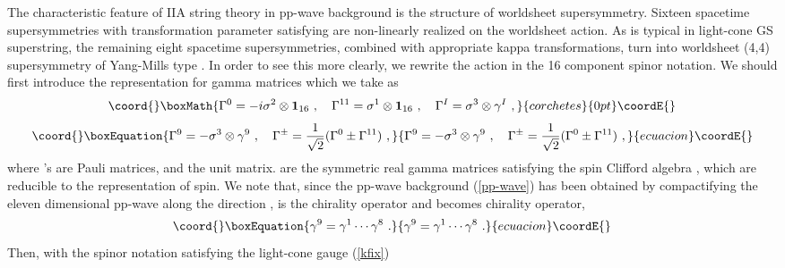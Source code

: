 \documentclass[a4paper,12pt]{article}
\numberwithin{equation}{section}
\begin{document}
The characteristic feature of IIA string theory in pp-wave background
is the structure of worldsheet supersymmetry.  Sixteen spacetime
supersymmetries with transformation parameter \myHighlight{$\epsilon$}\coordHE{} satisfying
\coordHE{} are non-linearly realized on the worldsheet
action.  As is typical in light-cone GS superstring, the remaining
eight spacetime supersymmetries, combined with appropriate kappa
transformations, turn into worldsheet (4,4) supersymmetry of
Yang-Mills type \cite{hyu074}.  In order to see this more clearly, we
rewrite the action \coordHE{} in the 16 component spinor notation.  We
should first introduce the representation for \coordHE{} gamma matrices
which we take as
\[\coord{}\boxMath{
 \Gamma^0= -i\sigma^2 \otimes {\bf 1}_{16}~,~~~
 \Gamma^{11}= \sigma^1 \otimes {\bf 1}_{16}~,~~~
 \Gamma^I= \sigma^3 \otimes \gamma^I~,
}{corchetes}{0pt}\coordE{}\]
\begin{equation}\coord{}\boxEquation{
 \Gamma^9= -\sigma^3 \otimes \gamma^9~,~~~
 \Gamma^{\pm} = \frac{1}{\sqrt{2}}(\Gamma^0 \pm \Gamma^{11})~,
\label{gamma}
}{
 \Gamma^9= -\sigma^3 \otimes \gamma^9~,~~~
 \Gamma^{\pm} = \frac{1}{\sqrt{2}}(\Gamma^0 \pm \Gamma^{11})~,
}{ecuacion}\coordE{}\end{equation}
where \myHighlight{$\sigma$}\coordHE{}'s are Pauli matrices, and \coordHE{} the \coordHE{} unit matrix. \coordHE{} are the \coordHE{} symmetric real
gamma matrices satisfying the spin\coordHE{} Clifford algebra \coordHE{}, which are reducible to the \coordHE{} representation of spin\coordHE{}.  We note that, since
the pp-wave background (\ref{pp-wave}) has been obtained by
compactifying the eleven dimensional pp-wave along the \coordHE{} direction
\cite{hyu074}, \coordHE{} is the \coordHE{} chirality operator and
\coordHE{} becomes \coordHE{} chirality operator,
\begin{equation}\coord{}\boxEquation{
\gamma^9 = \gamma^1 \cdots \gamma^8~.
}{
\gamma^9 = \gamma^1 \cdots \gamma^8~.
}{ecuacion}\coordE{}\end{equation}
Then, with the spinor notation \coordHE{} satisfying the light-cone gauge (\ref{kfix})
\end{document}
